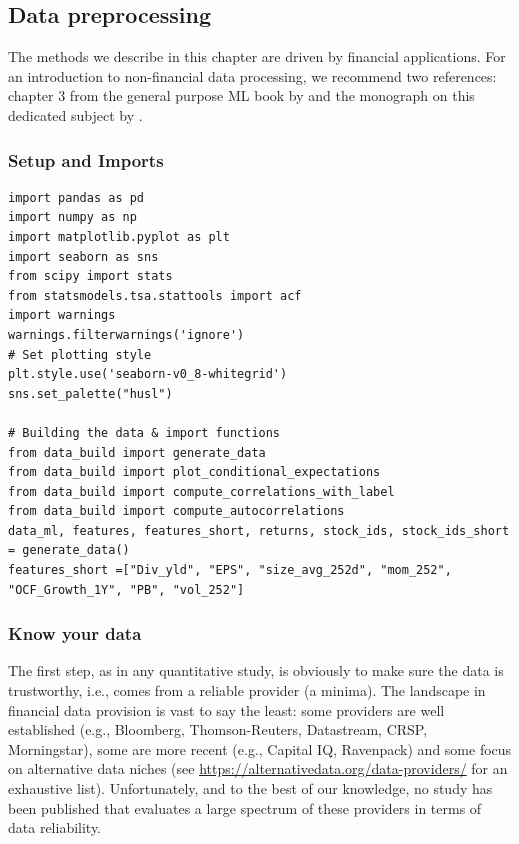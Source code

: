 \subsection{Data preprocessing}

The methods we describe in this chapter are driven by financial applications. For an introduction to non-financial data processing, we recommend two references: chapter 3 from the general purpose ML book by \cite{boehmke2019hands} and the monograph on this dedicated subject by \cite{kuhn2019feature}.

\subsubsection{Setup and Imports}

\begin{verbatim}
import pandas as pd
import numpy as np
import matplotlib.pyplot as plt
import seaborn as sns
from scipy import stats
from statsmodels.tsa.stattools import acf
import warnings
warnings.filterwarnings('ignore')
# Set plotting style
plt.style.use('seaborn-v0_8-whitegrid')
sns.set_palette("husl")

# Building the data & import functions
from data_build import generate_data
from data_build import plot_conditional_expectations
from data_build import compute_correlations_with_label
from data_build import compute_autocorrelations
data_ml, features, features_short, returns, stock_ids, stock_ids_short = generate_data()
features_short =["Div_yld", "EPS", "size_avg_252d", "mom_252", "OCF_Growth_1Y", "PB", "vol_252"]
\end{verbatim}

\subsubsection{Know your data}

The first step, as in any quantitative study, is obviously to make sure the data is trustworthy, i.e., comes from a reliable provider (a minima). The landscape in financial data provision is vast to say the least: some providers are well established (e.g., Bloomberg, Thomson-Reuters, Datastream, CRSP, Morningstar), some are more recent (e.g., Capital IQ, Ravenpack) and some focus on alternative data niches (see \href{https://alternativedata.org/data-providers/}{https://alternativedata.org/data-providers/} for an exhaustive list). Unfortunately, and to the best of our knowledge, no study has been published that evaluates a large spectrum of these providers in terms of data reliability.

